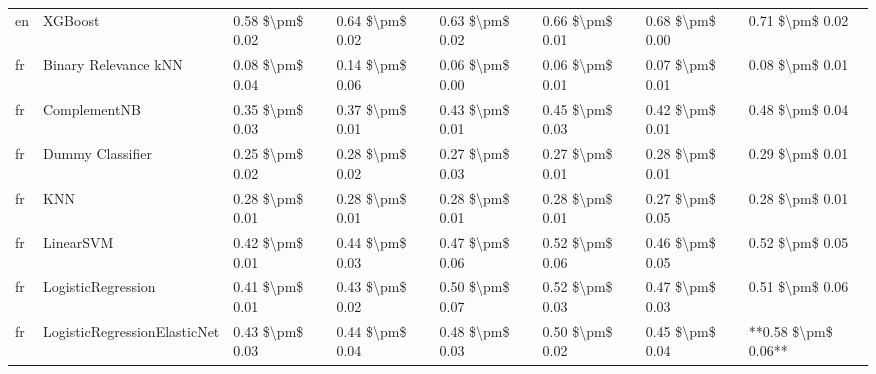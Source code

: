 \begin{tabular}{llllllll}
      en &                         XGBoost & 0.58 \$\textbackslash pm\$ 0.02 &           0.64 \$\textbackslash pm\$ 0.02 &       0.63 \$\textbackslash pm\$ 0.02 &        0.66 \$\textbackslash pm\$ 0.01 &                         0.68 \$\textbackslash pm\$ 0.00 &     0.71 \$\textbackslash pm\$ 0.02 \\
      fr &            Binary Relevance kNN & 0.08 \$\textbackslash pm\$ 0.04 &           0.14 \$\textbackslash pm\$ 0.06 &       0.06 \$\textbackslash pm\$ 0.00 &        0.06 \$\textbackslash pm\$ 0.01 &                         0.07 \$\textbackslash pm\$ 0.01 &     0.08 \$\textbackslash pm\$ 0.01 \\
      fr &                    ComplementNB & 0.35 \$\textbackslash pm\$ 0.03 &           0.37 \$\textbackslash pm\$ 0.01 &       0.43 \$\textbackslash pm\$ 0.01 &        0.45 \$\textbackslash pm\$ 0.03 &                         0.42 \$\textbackslash pm\$ 0.01 &     0.48 \$\textbackslash pm\$ 0.04 \\
      fr &                Dummy Classifier & 0.25 \$\textbackslash pm\$ 0.02 &           0.28 \$\textbackslash pm\$ 0.02 &       0.27 \$\textbackslash pm\$ 0.03 &        0.27 \$\textbackslash pm\$ 0.01 &                         0.28 \$\textbackslash pm\$ 0.01 &     0.29 \$\textbackslash pm\$ 0.01 \\
      fr &                             KNN & 0.28 \$\textbackslash pm\$ 0.01 &           0.28 \$\textbackslash pm\$ 0.01 &       0.28 \$\textbackslash pm\$ 0.01 &        0.28 \$\textbackslash pm\$ 0.01 &                         0.27 \$\textbackslash pm\$ 0.05 &     0.28 \$\textbackslash pm\$ 0.01 \\
      fr &                       LinearSVM & 0.42 \$\textbackslash pm\$ 0.01 &           0.44 \$\textbackslash pm\$ 0.03 &       0.47 \$\textbackslash pm\$ 0.06 &        0.52 \$\textbackslash pm\$ 0.06 &                         0.46 \$\textbackslash pm\$ 0.05 &     0.52 \$\textbackslash pm\$ 0.05 \\
      fr &              LogisticRegression & 0.41 \$\textbackslash pm\$ 0.01 &           0.43 \$\textbackslash pm\$ 0.02 &       0.50 \$\textbackslash pm\$ 0.07 &        0.52 \$\textbackslash pm\$ 0.03 &                         0.47 \$\textbackslash pm\$ 0.03 &     0.51 \$\textbackslash pm\$ 0.06 \\
      fr &    LogisticRegressionElasticNet & 0.43 \$\textbackslash pm\$ 0.03 &           0.44 \$\textbackslash pm\$ 0.04 &       0.48 \$\textbackslash pm\$ 0.03 &        0.50 \$\textbackslash pm\$ 0.02 &                         0.45 \$\textbackslash pm\$ 0.04 & **0.58 \$\textbackslash pm\$ 0.06** \\

\end{tabular}
